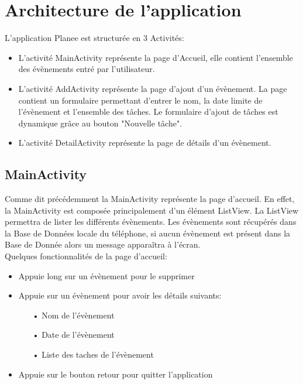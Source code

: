 \documentclass[12pt,a4paper]{report}
\begin{document}
\section{Architecture de l'application}
\begin{flushleft}
\justify
L'application Planee est structurée en 3 Activités:
\begin{itemize}
\item L'activité MainActivity représente la page d'Accueil, elle contient l'ensemble des évènements entré par l'utilisateur.
\item L'activité AddActivity représente la page d'ajout d'un évènement. La page contient un formulaire permettant d'entrer le nom, la date limite de l'évènement et l'ensemble des tâches. Le formulaire d'ajout de tâches est dynamique grâce au bouton "Nouvelle tâche".
\item L'activité DetailActivity représente la page de détails d'un évènement.
\end{itemize}
\end{flushleft}
\subsection{MainActivity}
\begin{flushleft}
\justify
Comme dit précédemment la MainActivity représente la page d'accueil. En effet, la MainActivity est composée principalement d'un élément ListView. La ListView permettra de lister les différents évènements. Les évènements sont récupérés dans la Base de Données locale du téléphone, si aucun évènement est présent dans la Base de Donnée alors un message apparaîtra à l'écran.\\

Quelques fonctionnalités de la page d'accueil:
\begin{itemize}
\item Appuie long sur un évènement pour le supprimer
\item Appuie sur un évènement pour avoir les détails suivants:
\begin{itemize}
\item[•] Nom de l'évènement
\item[•] Date de l'évènement
\item[•] Liste des taches de l'évènement
\end{itemize}
\item Appuie sur le bouton retour pour quitter l'application
\end{itemize}
\end{flushleft}
\end{document}
